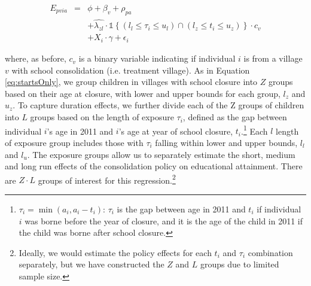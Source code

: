 \begin{singlespace}\vspace*{-\baselineskip}
\begin{eqnarray}
E_{pvia} & = & \phi+\beta_{v}+\rho_{pa} \nonumber \\
&  & + \hat{\lambda_{zl}} \cdot \mathbb{1}\left\{ (l_{l}\leq\tau_{i}\leq u_{l} ) \cap  ( l_{z}\leq t_{i}\leq u_{z} ) \right\} \cdot c_{v} \label{eq:startsLengths}\\
&  & +X_i\cdot\gamma\nonumber +\epsilon_{i}\nonumber
\end{eqnarray}
\end{singlespace}\noindent\ignorespaces
where, as before, \(c_{v}\) is a binary variable indicating if individual \(i\) is from a village \(v\) with school consolidation (i.e. treatment village). As in Equation \ref{eq:startsOnly}, we group children in villages with school closure into $Z$ groups based on their age at closure, with lower and upper bounds for each group, $l_{z}$ and $u_{z}$. To capture duration effects, we further divide each of the Z groups of children into $L$ groups based on the length of exposure $\tau_i$, defined as the gap between individual $i$'s age in 2011 and $i$'s age at year of school closure, $t_{i}$.\footnote{$\tau_i = \min(a_i, a_i - t_i)$: \(\tau_i\) is the gap between age in 2011 and $t_{i}$ if individual $i$ was borne before the year of closure, and it is the age of the child in 2011 if the child was borne after school closure. } Each $l$ length of exposure group includes those with $\tau_i$ falling within lower and upper bounds, $l_{l}$ and $l_{u}$. The exposure groups allow us to separately estimate the short, medium and long run effects of the consolidation policy on educational attainment. There are $Z\cdot L$ groups of interest for this regression.\footnote{Ideally, we would estimate the policy effects for each $t_i$ and $\tau_i$ combination separately, but we have constructed the $Z$ and $L$ groups due to limited sample size.}
